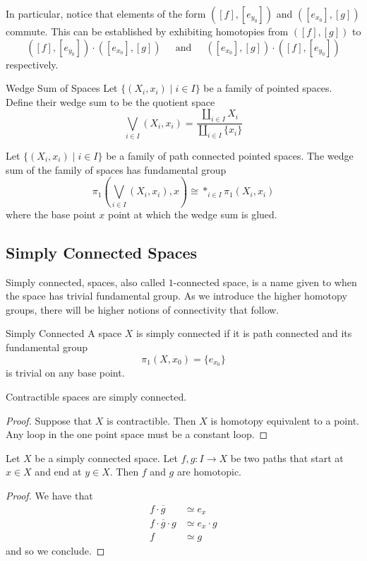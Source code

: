 \documentclass[a4paper]{article}
\begin{document}
In particular, notice that elements of the form $([f],[e_{y_0}])$ and $([e_{x_0}],[g])$ commute. This can be established by exhibiting homotopies from $([f],[g])$ to $$([f],[e_{y_0}])\cdot([e_{x_0}],[g])\;\;\;\;\text{ and }\;\;\;\;([e_{x_0}],[g])\cdot([f],[e_{y_0}])$$ respectively. 

\begin{defn}{Wedge Sum of Spaces}{} Let $\{(X_i,x_i)\;|\;i\in I\}$ be a family of pointed spaces. Define their wedge sum to be the quotient space $$\bigvee_{i\in I}(X_i,x_i)=\frac{\coprod_{i\in I}X_i}{\coprod_{i\in I}\{x_i\}}$$
\end{defn}

\begin{prp}{}{} Let $\{(X_i,x_i)\;|\;i\in I\}$ be a family of path connected pointed spaces. The wedge sum of the family of spaces has fundamental group $$\pi_1\left(\bigvee_{i\in I}(X_i,x_i),x\right)\cong\ast_{i\in I}\pi_1(X_i,x_i)$$ where the base point $x$ point at which the wedge sum is glued. 
\end{prp}

\subsection{Simply Connected Spaces}
Simply connected, spaces, also called $1$-connected space, is a name given to when the space has trivial fundamental group. As we introduce the higher homotopy groups, there will be higher notions of connectivity that follow. 

\begin{defn}{Simply Connected}{} A space $X$ is simply connected if it is path connected and its fundamental group $$\pi_1(X,x_0)=\{e_{x_0}\}$$ is trivial on any base point. 
\end{defn}

\begin{prp}{}{} Contractible spaces are simply connected. \tcbline
\begin{proof}
Suppose that $X$ is contractible. Then $X$ is homotopy equivalent to a point. Any loop in the one point space must be a constant loop. 
\end{proof}
\end{prp}

\begin{lmm}{}{} Let $X$ be a simply connected space. Let $f,g:I\to X$ be two paths that start at $x\in X$ and end at $y\in X$. Then $f$ and $g$ are homotopic. \tcbline
\begin{proof}
We have that 
\begin{align*}
f\cdot\overline{g}&\simeq e_x\\
f\cdot\overline{g}\cdot g&\simeq e_x\cdot g\\
f&\simeq g
\end{align*}
and so we conclude. 
\end{proof}
\end{lmm}
\end{document}
